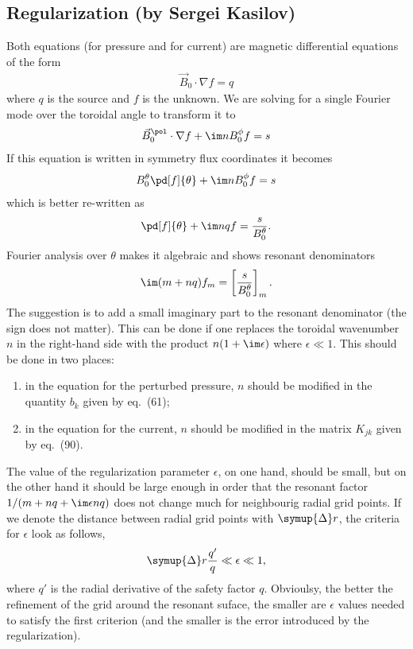\subsection{Regularization (by Sergei Kasilov)}

Both equations (for pressure and for current) are magnetic differential equations of the form
\begin{gather*}
  \vec{B}_{0} \cdot \nabla f = q
\end{gather*}
where $q$ is the source and $f$ is the unknown. We are solving for a single Fourier mode over the toroidal angle to transform it to
\begin{gather*}
  \vec{B}_{0}^{\pol} \cdot \nabla f + \im n {B}_{0}^{\phi} f = s
\end{gather*}
If this equation is written in symmetry flux coordinates it becomes
\begin{gather*}
  B_{0}^{\theta} \pd[f]{\theta} + \im n B_{0}^{\phi} f = s
\end{gather*}
which is better re-written as
\begin{gather*}
  \pd[f]{\theta} + \im n q f = \frac{s}{B_{0}^{\theta}}.
\end{gather*}
Fourier analysis over $\theta$ makes it algebraic and shows resonant denominators
\begin{gather*}
  \im (m + n q) f_{m} = \left [ \frac{s}{B_{0}^{\theta}} \right ]_{m}.
\end{gather*}
The suggestion is to add a small imaginary part to the resonant denominator (the sign does not matter). This can be done if one replaces the toroidal wavenumber $n$ in the right-hand side with the product $n (1 + \im \epsilon)$ where $\epsilon \ll 1$. This should be done in two places:
\begin{enumerate}
\item in the equation for the perturbed pressure, $n$ should be modified in the quantity $b_{k}$ given by eq.~(61);
\item in the equation for the current, $n$ should be modified in the matrix $K_{jk}$ given by eq.~(90).
\end{enumerate}
The value of the regularization parameter $\epsilon$, on one hand, should be small, but on the other hand it should be large enough in order that the resonant factor $1 / (m + n q + \im \epsilon n q)$ does not change much for neighbourig radial grid points. If we denote the distance between radial grid points with $\symup{\Delta} r$, the criteria for $\epsilon$ look as follows,
\begin{gather*}
  \symup{\Delta} r \frac{q'}{q} \ll \epsilon \ll 1,
\end{gather*}
where $q'$ is the radial derivative of the safety factor $q$.
Obvioulsy, the better the refinement of the grid around the resonant suface, the smaller are $\epsilon$ values needed to satisfy the first criterion (and the smaller is the error introduced by the regularization).

